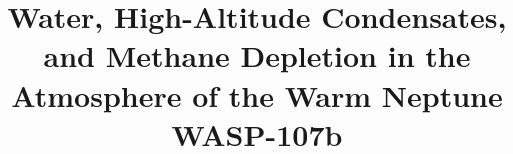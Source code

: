 \documentclass[twocolumn]{aastex61}
\begin{document}
\title{Water, High-Altitude Condensates, and Methane Depletion in the Atmosphere of the Warm Neptune WASP-107\lowercase{b}}


\end{document}

